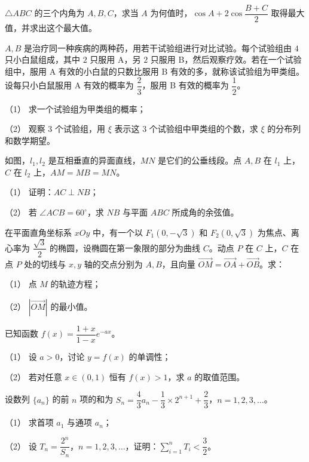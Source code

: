 \begin{question}
$\triangle ABC$ 的三个内角为 $A,B,C$，求当 $A$ 为何值时，$\cos A+2\cos\dfrac{B+C}{2}$ 取得最大值，并求出这个最大值。

\end{question}
\begin{question}
$A,B$ 是治疗同一种疾病的两种药，用若干试验组进行对比试验。每个试验组由 $4$ 只小白鼠组成，其中 $2$ 只服用 A，另 $2$ 只服用 B，然后观察疗效。若在一个试验组中，服用 A 有效的小白鼠的只数比服用 B 有效的多，就称该试验组为甲类组。设每只小白鼠服用 A 有效的概率为 $\dfrac23$，服用 B 有效的概率为 $\dfrac12$。

（1） 求一个试验组为甲类组的概率；

（2） 观察 $3$ 个试验组，用 $\xi$ 表示这 $3$ 个试验组中甲类组的个数，求 $\xi$ 的分布列和数学期望。

\Needspace{0.4\textheight}
\end{question}
\begin{question}
如图，$l_1,l_2$ 是互相垂直的异面直线，$MN$ 是它们的公垂线段。点 $A,B$ 在 $l_1$ 上，$C$ 在 $l_2$ 上，$AM=MB=MN$。
\nopagebreak[4]
\begin{center}\end{center}
\nopagebreak[4]
（1） 证明：$AC\perp NB$；

（2） 若 $\angle ACB=60^\circ$，求 $NB$ 与平面 $ABC$ 所成角的余弦值。

\end{question}
\begin{question}
在平面直角坐标系 $xOy$ 中，有一个以 $F_1(0,-\sqrt3)$ 和 $F_2(0,\sqrt3)$ 为焦点、离心率为 $\dfrac{\sqrt3}{2}$ 的椭圆，设椭圆在第一象限的部分为曲线 $C$。动点 $P$ 在 $C$ 上，$C$ 在点 $P$ 处的切线与 $x,y$ 轴的交点分别为 $A,B$，且向量 $\overrightarrow{OM}=\overrightarrow{OA}+\overrightarrow{OB}$。求：

（1） 点 $M$ 的轨迹方程；

（2） $|\overrightarrow{OM}|$ 的最小值。

\end{question}
\begin{question}
已知函数 $f(x)=\dfrac{1+x}{1-x}e^{-ax}$。

（1） 设 $a>0$，讨论 $y=f(x)$ 的单调性；

（2） 若对任意 $x\in(0,1)$ 恒有 $f(x)>1$，求 $a$ 的取值范围。

\end{question}
\begin{question}
设数列 $\{a_n\}$ 的前 $n$ 项的和为 $S_n=\dfrac43a_n-\dfrac13\times2^{n+1}+\dfrac23$，$n=1,2,3,\ldots$。

（1） 求首项 $a_1$ 与通项 $a_n$；

（2） 设 $T_n=\dfrac{2^n}{S_n}$，$n=1,2,3,\ldots$，证明：$\displaystyle\sum_{i=1}^nT_i<\dfrac32$。

\end{question}